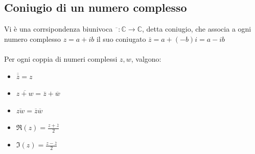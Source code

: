 \documentclass{report}
\begin{document}
\subsection{Coniugio di un numero complesso}
Vi è una corrsipondenza biunivoca $\overline{\phantom{z}} : \mathbb{C} \to \mathbb{C}$, detta coniugio, che associa a ogni numero complesso $z = a + ib$ il suo coniugato $\overline{z} = a + (-b)i = a - ib$
\\ \\
Per ogni coppia di numeri complessi $z, w$, valgono:
\begin{itemize}
    \item{$\overline{\overline{z}} = z$}
    \item{$\overline{z + w} = \overline{z} + \overline{w}$}
    \item{$\overline{zw} = \overline{z} \overline{w}$}
    \item{$\Re(z) = \frac{z + \overline{z}}{2}$}
    \item{$\Im(z) = \frac{z - \overline{z}}{2}$}
\end{itemize}
\end{document}
